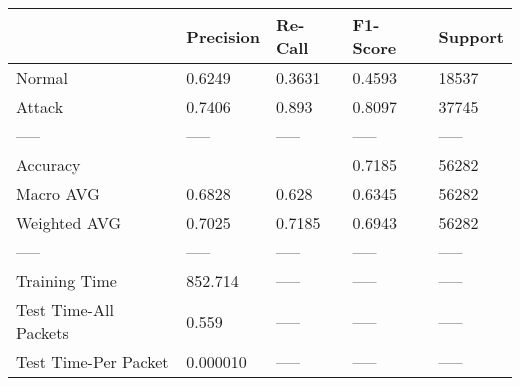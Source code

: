 \begin{tabular}{lllll}
\toprule
{} & Precision & Re-Call & F1-Score & Support \\
\midrule
Normal                &    0.6249 &  0.3631 &   0.4593 &   18537 \\
Attack                &    0.7406 &   0.893 &   0.8097 &   37745 \\
-----                 &     ----- &   ----- &    ----- &   ----- \\
Accuracy              &           &         &   0.7185 &   56282 \\
Macro AVG             &    0.6828 &   0.628 &   0.6345 &   56282 \\
Weighted AVG          &    0.7025 &  0.7185 &   0.6943 &   56282 \\
-----                 &     ----- &   ----- &    ----- &   ----- \\
Training Time         &   852.714 &   ----- &    ----- &   ----- \\
Test Time-All Packets &     0.559 &   ----- &    ----- &   ----- \\
Test Time-Per Packet  &  0.000010 &   ----- &    ----- &   ----- \\
\bottomrule
\end{tabular}
